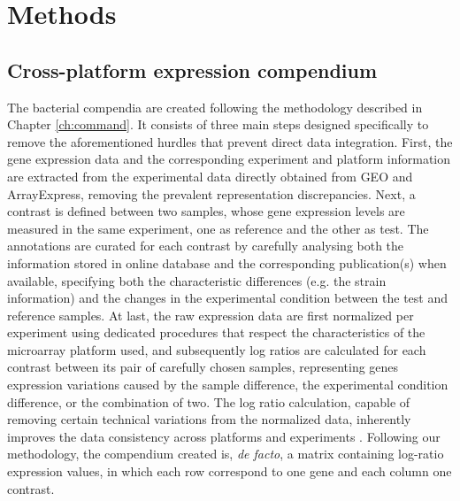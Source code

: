 \section{Methods}


\subsection{Cross-platform expression compendium} 
\label{sec:colombos-comp-method}


The bacterial compendia are created following the methodology described in 
Chapter \ref{ch:command}.
It consists of three main steps designed specifically to remove the 
aforementioned hurdles that prevent direct data integration.
First, the gene expression data and the corresponding experiment and platform 
information are extracted from the experimental data directly obtained from 
GEO and ArrayExpress, removing the prevalent representation discrepancies.
%
Next, a contrast is defined between two samples, whose gene expression levels 
are measured in the same experiment, one as reference and the other as test.
The annotations are curated for each contrast by carefully analysing both the 
information stored in online database and the corresponding publication(s) when 
available, specifying both the characteristic differences (e.g. the strain 
information) and the changes in the experimental condition between the test 
and reference samples.
%
%
At last, the raw expression data are first normalized per experiment using 
dedicated procedures that respect the characteristics of the microarray 
platform used, and subsequently log ratios are calculated for each contrast 
between its pair of carefully chosen samples, representing genes expression 
variations caused by the sample difference, the experimental condition 
difference, or the combination of two.
The log ratio calculation, capable of removing certain technical variations 
from the normalized data, inherently improves the data consistency across 
platforms and experiments \cite{Shi2006, Shi2008}.
%
Following our methodology, the compendium created is, \textit{de facto}, a 
matrix containing log-ratio expression values, in which each row correspond to 
one gene and each column one contrast.
%


